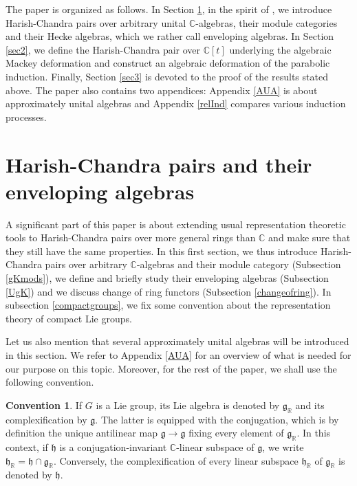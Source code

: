\documentclass{amsart}
\theoremstyle{definition}
\newtheorem{convention}{Convention}
\begin{document}
The paper is organized as follows. In Section \ref{sec1}, in the spirit of \cite{BHS}, we introduce Harish-Chandra pairs over arbitrary unital $\mathbb{C}$-algebras, their module categories and their Hecke algebras, which we rather call enveloping algebras. In Section \ref{sec2}, we define the Harish-Chandra pair over $\mathbb{C}[t]$ underlying the algebraic Mackey deformation and construct an algebraic deformation of the parabolic induction. Finally, Section \ref{sec3} is devoted to the proof of the results stated above. The paper also contains two appendices: Appendix \ref{AUA} is about approximately unital algebras and Appendix \ref{relInd} compares various induction processes.

\section{Harish-Chandra pairs and their enveloping algebras}\label{sec1}

A significant part of this paper is about extending usual representation theoretic tools to Harish-Chandra pairs over more general rings than $\mathbb{C}$ and make sure that they still have the same properties. In this first section, we thus introduce Harish-Chandra pairs over arbitrary $\mathbb{C}$-algebras and their module category (Subsection \ref{gKmods}), we define and briefly study their enveloping algebras (Subsection \ref{UgK}) and we discuss change of ring functors (Subsection \ref{changeofring}). In subsection \ref{compactgroups}, we fix some convention about the representation theory of compact Lie groups.

Let us also mention that several approximately unital algebras will be introduced in this section. We refer to Appendix \ref{AUA} for an overview of what is needed for our purpose on this topic. Moreover, for the rest of the paper, we shall use the following convention.

\begin{convention}\label{NotationComplexLie}
    If $G$ is a Lie group, its Lie algebra is denoted by $\mathfrak{g}_\mathbb{R}$ and its complexification by $\mathfrak{g}$. The latter is equipped with the conjugation, which is by definition the unique antilinear map $\mathfrak{g} \to \mathfrak{g}$ fixing every element of $\mathfrak{g}_\mathbb{R}$. In this context, if $\mathfrak{h}$ is a conjugation-invariant $\mathbb{C}$-linear subspace of $\mathfrak{g}$, we write $\mathfrak{h}_\mathbb{R} = \mathfrak{h} \cap \mathfrak{g}_\mathbb{R}$. Conversely, the complexification of every linear subspace $\mathfrak{h}_\mathbb{R}$ of $\mathfrak{g}_\mathbb{R}$ is denoted by $\mathfrak{h}$.
\end{convention}
\end{document}
